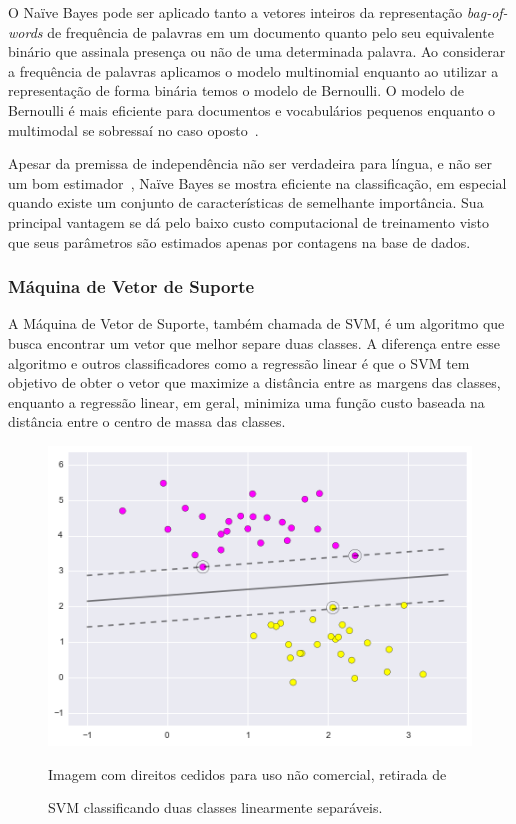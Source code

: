 O Naïve Bayes pode ser aplicado tanto a vetores inteiros da representação
\textit{bag-of-words} de frequência de palavras em um documento quanto pelo seu
equivalente binário que assinala presença ou não de uma determinada palavra.
Ao considerar a frequência de palavras aplicamos o modelo multinomial enquanto
ao utilizar a representação de forma binária temos o modelo de Bernoulli.
O modelo de Bernoulli é mais eficiente para documentos e vocabulários pequenos
enquanto o multimodal se sobressaí no caso oposto~\cite{schutze08}.

Apesar da premissa de independência não ser verdadeira para língua, e não ser um
bom estimador~\cite{schutze08}, Naïve Bayes se mostra eficiente na
classificação, em especial quando existe um conjunto de características de
semelhante importância.
Sua principal vantagem se dá pelo baixo custo computacional de treinamento visto
que seus parâmetros são estimados apenas por contagens na base de dados.

\subsubsection{Máquina de Vetor de Suporte}
\label{sec:svm}

A Máquina de Vetor de Suporte, também chamada de SVM, é um algoritmo que busca
encontrar um vetor que melhor separe duas classes.
A diferença entre esse algoritmo e outros classificadores como a regressão
linear é que o SVM tem objetivo de obter o vetor que maximize a distância entre
as margens das classes, enquanto a regressão linear, em geral, minimiza uma
função custo baseada na distância entre o centro de massa das classes.

\begin{figure}
\begin{center} {
    \begin{center}
    \includegraphics[scale=0.6]{images/svm.png}
    \caption{SVM classificando duas classes linearmente separáveis.}
    \small Imagem com direitos cedidos para uso não comercial, retirada de~\cite{vanderplas15}
    \label{fig:svm}
    \end{center}
}
\end{center}
\end{figure}

